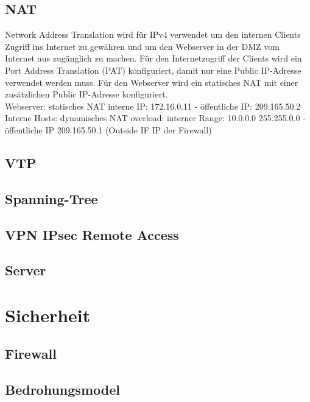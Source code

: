 \documentclass[11pt,a4paper,parskip=half]{scrartcl}
\begin{document}
\subsection{NAT}
Network Address Translation wird für IPv4 verwendet um den internen Clients Zugriff ins Internet zu gewähren und um den Webserver in der DMZ vom Internet aus zugänglich zu machen. Für den Internetzugriff der Clients wird ein Port Address Translation (PAT) konfiguriert, damit nur eine Public IP-Adresse verwendet werden muss. Für den Webserver wird ein statisches NAT mit einer zusätzlichen Public IP-Adresse konfiguriert.\\

Webserver: statisches NAT interne IP: 172.16.0.11 - öffentliche IP: 209.165.50.2\\
Interne Hosts: dynamisches NAT overload: interner Range: 10.0.0.0 255.255.0.0 - öffentliche IP 209.165.50.1 (Outside IF IP der Firewall)

\subsection{VTP}
\subsection{Spanning-Tree}
\subsection{VPN IPsec Remote Access}
\subsection{Server}

\section{Sicherheit}
\subsection{Firewall}
\subsection{Bedrohungsmodel}
\end{document}
